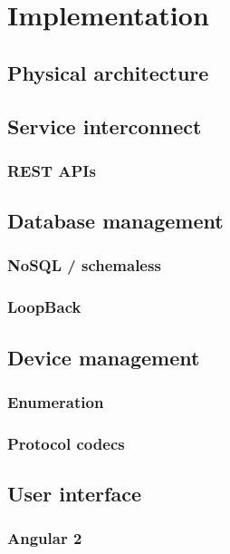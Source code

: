 \documentclass[../thesis]{subfiles}
\begin{document}
\chapter{Implementation}



\section{Physical architecture}



\section{Service interconnect}

\subsection{REST APIs}



\section{Database management}

\subsection{NoSQL / schemaless}
\subsection{LoopBack}


\section{Device management}

\subsection{Enumeration}
\subsection{Protocol codecs}



\section{User interface}

\subsection{Angular 2}
\end{document}
